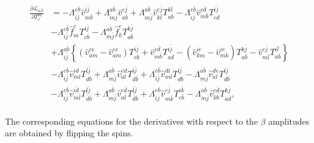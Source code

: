 \documentclass[a4paper,12pt,oneside]{book}
\newcommand{\spa}[1]{{#1}}
\newcommand{\spb}[1]{\bar{#1}}
\begin{document}
\begin{equation}
\begin{aligned}
\frac{\partial\mathcal{L}_{\alpha\beta}}{\partial T^{\spa{m}}_{\spa{e}}}&=
 -Λ_{\spa{i}\spb{j}}^{\spa{e}\spb{b}} \hat v_{\spa{m}\spb{b}}^{\spa{i}\spb{j}}
 +Λ_{\spa{m}\spb{j}}^{\spa{a}\spb{b}} \hat v_{\spa{a}\spb{b}}^{\spa{e}\spb{j}}
+ Λ_{\spa{m}\spb{j}}^{\spa{a}\spb{b}} \hat v_{\spa{k}\spb{l}}^{\spa{e}\spb{j}} 
T^{\spa{k}\spb{l}}_{\spa{a}\spb{b}}
- Λ_{\spa{i}\spb{j}}^{\spa{e}\spb{b}} \hat v_{\spa{m}\spb{b}}^{\spa{c}\spb{d}} T^{\spa{i}\spb{j}}_{\spa{c}\spb{d}}\\
&- Λ_{\spa{i}\spb{j}}^{\spa{e}\spb{b}} 
  \hat f_{\spa{m}}^{\spa{c}} T^{\spa{i}\spb{j}}_{\spa{c}\spb{b}}
- Λ_{\spa{m}\spb{j}}^{\spa{a}\spb{b}}
  \hat f_{\spa{k}}^{\spa{e}} T^{\spa{k}\spb{j}}_{\spa{a}\spb{b}}\\ 
&+ Λ_{\spa{i}\spb{j}}^{\spa{a}\spb{b}}\left\{ 
  \left(\hat v_{\spa{a}\spa{m}}^{\spa{c}\spa{e}} - \hat v_{\spa{a}\spa{m}}^{\spa{e}\spa{c}}\right)T^{\spa{i}\spb{j}}_{\spa{c}\spb{b}}
 +\hat v_{\spa{m}\spb{b}}^{\spa{e}\spb{d}} T^{\spa{i}\spb{j}}_{\spa{a}\spb{d}}
- \left(\hat v_{\spa{k}\spa{m}}^{\spa{i}\spa{e}} - \hat v_{\spa{m}\spa{k}}^{\spa{i}\spa{e}}\right)T^{\spa{k}\spb{j}}_{\spa{a}\spb{b}} 
- \hat v_{\spa{m}\spb{l}}^{\spa{e}\spb{j}} T^{\spa{i}\spb{l}}_{\spa{a}\spb{b}} \right\}\\
&- Λ_{\spa{i}\spb{j}}^{\spa{e}\spb{b}}
\hat v_{\spa{m}\spa{l}}^{\spa{i}\spa{d}} T^{\spa{l}\spb{j}}_{\spa{d}\spb{b}}
+ Λ_{\spa{m}\spb{j}}^{\spa{a}\spb{b}}
\hat v_{\spa{a}\spa{l}}^{\spa{e}\spa{d}} T^{\spa{l}\spb{j}}_{\spa{d}\spb{b}}
+ Λ_{\spa{i}\spb{j}}^{\spa{e}\spb{b}}
\hat v_{\spa{m}\spa{l}}^{\spa{d}\spa{i}} T^{\spa{l}\spb{j}}_{\spa{d}\spb{b}}
- Λ_{\spa{m}\spb{j}}^{\spa{a}\spb{b}}
\hat v_{\spa{a}\spa{l}}^{\spa{d}\spa{e}} T^{\spa{l}\spb{j}}_{\spa{d}\spb{b}} \\
&- Λ_{\spa{i}\spb{j}}^{\spa{e}\spb{b}} 
\hat v_{\spa{m}\spb{l}}^{\spa{i}\spb{d}} T^{\spb{l}\spb{j}}_{\spb{d}\spb{b}}
+ Λ_{\spa{m}\spb{j}}^{\spa{a}\spb{b}} 
\hat v_{\spa{a}\spb{l}}^{\spa{e}\spb{d}} T^{\spb{l}\spb{j}}_{\spb{d}\spb{b}}
+ Λ_{\spa{i}\spb{j}}^{\spa{e}\spb{b}} 
\hat v_{\spa{m}\spb{k}}^{\spa{c}\spb{j}} T^{\spa{i}\spb{k}}_{\spa{c}\spb{b}}
- Λ_{\spa{m}\spb{j}}^{\spa{a}\spb{b}} 
\hat v_{\spa{k}\spb{b}}^{\spa{e}\spb{d}} T^{\spa{k}\spb{j}}_{\spa{a}\spb{d}}
,\\
\end{aligned}
\end{equation}

The corresponding equations for the derivatives with respect to the $\beta$ amplitudes are obtained by flipping the spins.
\end{document}
